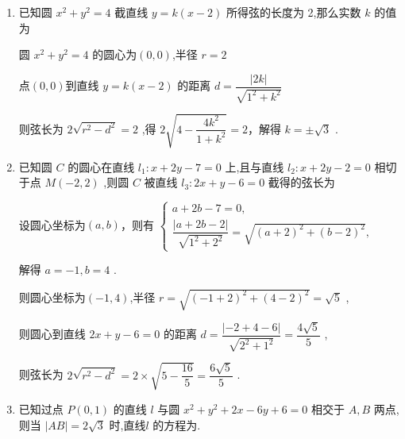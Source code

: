 \begin{enumerate}
\begin{enumerate}
\begin{jieda}
            圆心$(1,2)$到直线 $x + y - 1 = 0$ 的距离 $d = \dfrac{\left| 1 + 2 - 1\right| }{\sqrt{{1}^{2} + {1}^{2}}} = \sqrt{2}$ 
            
            因此直线 $m$ 被圆 $M$ 截得的弦长等于 $2\sqrt{{\left( \sqrt{5}\right) }^{2} - {\left( \sqrt{2}\right) }^{2}} = 2\sqrt{3}$ .
        \end{jieda}
        \item 已知圆 ${x}^{2} + {y}^{2} = 4$ 截直线 $y = k\left( {x - 2}\right)$ 所得弦的长度为 2,那么实数 $k$ 的值为
        \begin{jieda}
            圆 ${x}^{2} + {y}^{2} = 4$ 的圆心为$(0,0)$,半径 $r = 2$
            
            点$(0,0)$到直线 $y = k\left( {x - 2}\right)$ 的距离 $d = \dfrac{\left| 2k\right| }{\sqrt{{1}^{2} + {k}^{2}}}$
            
            则弦长为 $2\sqrt{{r}^{2} - {d}^{2}} = 2$ ,得 $2\sqrt{4 - \dfrac{4{k}^{2}}{1 + {k}^{2}}} = 2$，解得 $k =  \pm  \sqrt{3}$ .
        \end{jieda}
        \item 已知圆 $C$ 的圆心在直线 ${l}_{1} : x + {2y} - 7 = 0$ 上,且与直线 ${l}_{2} : x + {2y} - 2 = 0$ 相切于点 $M\left( {-2,2}\right)$ ,则圆 $C$ 被直线 ${l}_{3} : {2x} + y - 6 = 0$ 截得的弦长为
        \begin{jieda}
            设圆心坐标为$(a, b)$，则有 $\left\{  \begin{array}{l} a + {2b} - 7 = 0, \\  \dfrac{\left| a + 2b - 2\right| }{\sqrt{{1}^{2} + {2}^{2}}} = \sqrt{{\left( a + 2\right) }^{2} + {\left( b - 2\right) }^{2}}, \end{array}\right.$
            
            解得 $a =  - 1,b = 4$ .
            
            则圆心坐标为$(-1,4)$,半径 $r = \sqrt{{\left( -1 + 2\right) }^{2} + {\left( 4 - 2\right) }^{2}} = \sqrt{5}$ ,
            
            则圆心到直线 ${2x} + y - 6 = 0$ 的距离 $d = \dfrac{\left| -2 + 4 - 6\right| }{\sqrt{{2}^{2} + {1}^{2}}} = \dfrac{4\sqrt{5}}{5}$ ,
            
            则弦长为 $2\sqrt{{r}^{2} - {d}^{2}} = 2 \times  \sqrt{5 - \dfrac{16}{5}} = \dfrac{6\sqrt{5}}{5}$ .
        \end{jieda}
        
        \item 已知过点 $P\left( {0,1}\right)$ 的直线 $l$ 与圆 ${x}^{2} + {y}^{2} + {2x} - {6y} + 6 = 0$ 相交于 $A,B$ 两点,则当 $\left| {AB}\right|  = 2\sqrt{3}$ 时,直线$l$ 的方程为.


\end{enumerate}
\end{enumerate}
